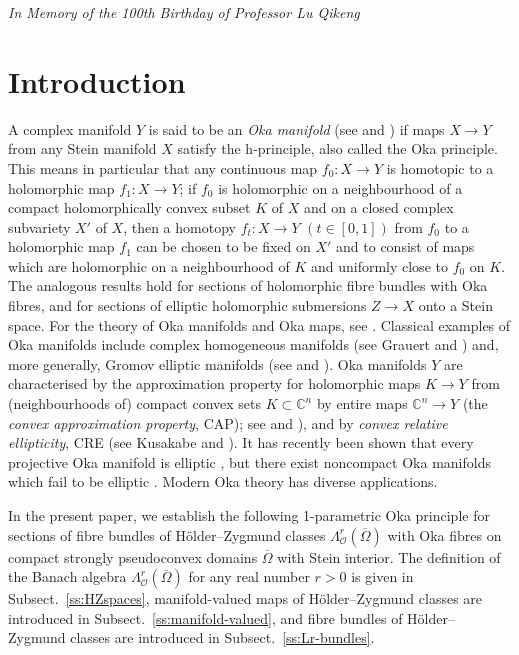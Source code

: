 \documentclass[11pt]{amsart}
\numberwithin{equation}{section}
\theoremstyle{definition}
\newcommand\Oscr{\mathscr{O}}
\newcommand\C{\mathbb{C}}
\begin{document}
\centerline{\em In Memory of the 100th Birthday of Professor Lu Qikeng}

\setcounter{tocdepth}{1}
\tableofcontents

%
%
\section{Introduction}
\label{sec:intro}

A complex manifold $Y$ is said to be an {\em Oka manifold} 
(see \cite{Forstneric2009CR} and \cite[Chap.\ 5]{Forstneric2017E}) if maps
$X\to Y$ from any Stein manifold $X$ satisfy the h-principle, also called
the Oka principle. This means in particular that any continuous map 
$f_0:X\to Y$ is homotopic to a holomorphic map $f_1:X\to Y$;
if $f_0$ is holomorphic on a neighbourhood of a compact holomorphically
convex subset $K$ of $X$ and on a closed complex subvariety 
$X'$ of $X$, then a homotopy $f_t:X\to Y$ $(t\in [0,1])$ 
from $f_0$ to a holomorphic map $f_1$ can be chosen to 
be fixed on $X'$ and to consist of maps which are holomorphic on a 
neighbourhood of $K$ and uniformly close to $f_0$ on $K$. 
The analogous results hold
for sections of holomorphic fibre bundles with Oka fibres, and for sections
of elliptic holomorphic submersions $Z\to X$ onto a Stein space.
For the theory of Oka manifolds and Oka maps, see 
\cite{Forstneric2023Indag,Forstneric2026ICM,Forstneric2017E,ForstnericLarusson2011}. 
Classical examples of Oka manifolds include complex homogeneous 
manifolds (see Grauert \cite{Grauert1957I,Grauert1957II} and 
\cite[Proposition 5.6.1]{Forstneric2017E}) and, more generally, 
Gromov elliptic manifolds 
(see \cite{Gromov1989} and \cite[Corollary 5.6.14]{Forstneric2017E}).
Oka manifolds $Y$ are characterised by the approximation
property for holomorphic maps $K\to Y$ from (neighbourhoods of)
compact convex sets $K\subset\C^n$ by entire maps
$\C^n\to Y$ (the {\em convex approximation property}, CAP);
see \cite{Forstneric2009CR} and \cite[Theorem 5.4.4]{Forstneric2017E}), 
and by {\em convex relative ellipticity}, CRE  
(see Kusakabe \cite[Theorem 1.3]{Kusakabe2021IUMJ} and
\cite[Definition 1.5 and Theorem 1.6]{Forstneric2026ICM}).
It has recently been shown that every projective Oka manifold is 
elliptic \cite{ForstnericLarusson2025MRL}, but there exist 
noncompact Oka manifolds which fail to be elliptic 
\cite{Kusakabe2024AM,Forstneric2023Indag}. 
Modern Oka theory has diverse applications.

In the present paper, we establish the following 1-parametric
Oka principle for sections of fibre bundles of 
H\"older--Zygmund classes $\Lambda^r_\Oscr(\overline\Omega)$ 
with Oka fibres on compact strongly pseudoconvex domains 
$\overline \Omega$ with Stein interior.
The definition of the Banach algebra 
$\Lambda^r_\Oscr(\overline\Omega)$ for any real number $r>0$ 
is given in Subsect.\ \ref{ss:HZspaces}, manifold-valued maps
of H\"older--Zygmund classes are introduced in Subsect.\ 
\ref{ss:manifold-valued}, and fibre bundles of H\"older--Zygmund classes
are introduced in Subsect.\ \ref{ss:Lr-bundles}.
\end{document}

